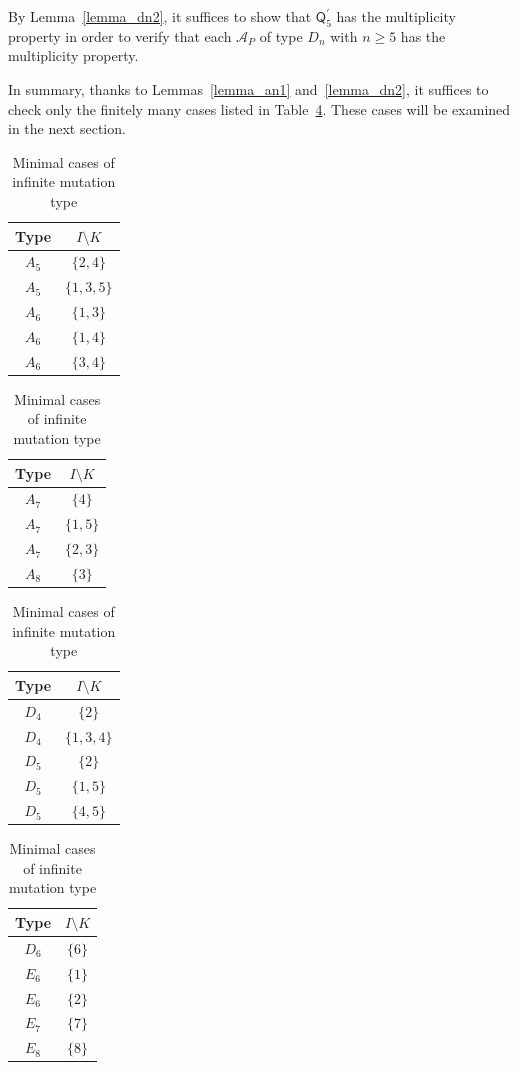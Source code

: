 \documentclass[11pt]{amsart}
\numberwithin{equation}{section}
\theoremstyle{plain}
\theoremstyle{definition}
\numberwithin{equation}{section}
\begin{document}
By Lemma~\ref{lemma_dn2}, it suffices to show that $\mathsf{Q}_5^\prime$ has the multiplicity property in order to verify that each $\mathcal{A}_P$ of type $D_n$ with $n \geq 5$ has the multiplicity property.

In summary, thanks to Lemmas~\ref{lemma_an1} and~\ref{lemma_dn2}, it suffices to check only the finitely many cases listed in Table~\ref{table_minimalparbolic}. These cases will be examined in the next section.

\begin{table}[h]
\begin{center}
\begin{tabular}{| c | c |  }
 \hline
 Type & $I \setminus K$ \\ 
\hline  \hline
$A_5$ & $\{2, 4\}$   \\   
$A_5$ & $\{1, 3, 5\}$  \\
\hline     
$A_6$ & $\{1,3\}$   \\   
$A_6$ & $\{1,4\}$   \\   
$A_6$ & $\{3,4\}$   \\   
\hline
\end{tabular}
\quad \quad
\begin{tabular}{| c | c |  }
 \hline
 Type & $I \setminus K$ \\ 
\hline  \hline
$A_7$ & $\{4\}$   \\   
$A_7$ & $\{1,5\}$   \\   
$A_7$ & $\{2,3\}$   \\   
\hline
$A_8$ & $\{3\}$   \\   
\hline 
\end{tabular}
\quad \quad
\begin{tabular}{| c | c |  }
 \hline
 Type & $I \setminus K$ \\ 
\hline  \hline
$D_4$ & $\{2\}$  \\   
$D_4$ & $\{1,3,4\}$  \\
\hline
$D_5$ & $\{2\}$  \\   
$D_5$ & $\{1,5\}$  \\   
$D_5$ & $\{4,5\}$  \\   
\hline
\end{tabular}
\quad \quad
\begin{tabular}{| c | c |  }
 \hline
 Type & $I \setminus K$ \\ 
\hline  \hline
$D_6$ & $\{6\}$  \\   
\hline
$E_6$ & $\{1\}$  \\   
$E_6$ & $\{2\}$  \\
\hline
$E_7$ & $\{7\}$  \\
\hline
$E_8$ & $\{8\}$  \\
\hline
\end{tabular}
\end{center}
\caption{Minimal cases of infinite mutation type}
\label{table_minimalparbolic}
\end{table}
\end{document}
